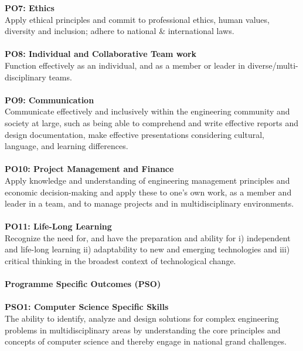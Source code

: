 \textbf{PO7: Ethics} \\
Apply ethical principles and commit to professional ethics, human values, diversity and inclusion; adhere to national \& international laws. \\ \\

\textbf{PO8: Individual and Collaborative Team work} \\
Function effectively as an individual, and as a member or leader in diverse/multi-disciplinary teams. \\ \\

\textbf{PO9: Communication} \\
Communicate effectively and inclusively within the engineering community and society at large, such as being able to comprehend and write effective reports and design documentation, make effective presentations considering cultural, language, and learning differences. \\ \\

\textbf{PO10: Project Management and Finance} \\
Apply knowledge and understanding of engineering management principles and economic decision-making and apply these to one’s own work, as a member and leader in a team, and to manage projects and in multidisciplinary environments. \\ \\

\textbf{PO11: Life-Long Learning} \\
Recognize the need for, and have the preparation and ability for i) independent and life-long learning ii) adaptability to new and emerging technologies and iii) critical thinking in the broadest context of technological change. \\ \\


\textbf{Programme Specific Outcomes (PSO)} \\ \\

\textbf{PSO1: Computer Science Specific Skills} \\
The ability to identify, analyze and design solutions for complex engineering problems in multidisciplinary areas by understanding the core principles and concepts of computer science and thereby engage in national grand challenges.  \\ \\

